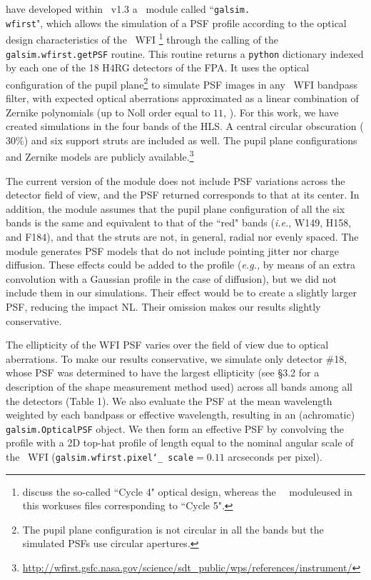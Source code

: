 \documentclass[11pt,preprint,flushrt]{aastex}
\begin{document}
\citet{kannawadi15} have developed within \gs\ v1.3 a \wfa\ module called ``{\tt{galsim.\\ wfirst}}", which allows the simulation of a PSF profile according to the optical design characteristics of the \wfa\ WFI \citep{pasquale14}\footnote{\citealt{pasquale14} discuss the so-called ``Cycle 4" optical design, whereas the \gs\ \wfa\ module\textemdash used in this work\textemdash uses files corresponding to ``Cycle 5".} through the calling of the {\tt{galsim.wfirst.getPSF}} routine. 
This routine returns a {\tt{python}} dictionary indexed by each one of the 18 H4RG detectors of the FPA. It uses the optical configuration of the pupil plane\footnote{The pupil plane configuration is not circular in all the bands but the simulated PSFs use circular apertures.} to simulate PSF images in any \wfa\ WFI bandpass filter, with expected optical aberrations approximated as a linear combination of Zernike polynomials (up to Noll order equal to $11$, \citealt{noll67}). For this work, we have created simulations in the four bands of the HLS.  A central circular obscuration ($30 \%$) and six support struts are included as well. The pupil plane configurations and Zernike models are publicly available.\footnote{\url{http://wfirst.gsfc.nasa.gov/science/sdt_public/wps/references/instrument/}} 

The current version of the module does not include PSF variations across the detector field of view, and the PSF returned corresponds to that at its center. In addition, the module assumes that the pupil plane configuration of all the six bands is the same and equivalent to that of the ``red" bands (\emph{i.e.}, W149, H158, and F184), and that the struts are not, in general, radial nor evenly spaced. 
The module generates PSF models that do not include pointing jitter nor charge diffusion. These effects could be added to the profile (\emph{e.g.,} by means of an extra convolution with a Gaussian profile in the case of diffusion), but we did not include them in our simulations. Their effect would be to create a slightly larger PSF, reducing the impact NL. Their omission makes our results slightly conservative.  

The ellipticity of the WFI PSF varies over the field of view due to optical aberrations. To make our results conservative, we simulate only detector \#18, whose PSF was determined to have the largest ellipticity (see \S3.2 for a description of the shape measurement method used) across all bands among all the detectors (Table 1). We also evaluate the PSF at the mean wavelength weighted by each bandpass or effective wavelength, resulting in an (achromatic) {\tt{galsim.OpticalPSF}} object.
We then form an effective PSF by convolving the profile with a 2D top-hat profile of length equal to the nominal angular scale of the \wfa\ WFI ({\tt{galsim.wfirst.pixel\char`_ scale$=0.11$}} arcseconds per pixel). 
\end{document}
